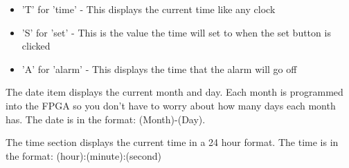 \documentclass[12pt,a4paper,hidelinks]{article}            %
\begin{document}
\begin{itemize}
  \item 'T' for 'time' - This displays the current time like any clock
  \item 'S' for 'set' - This is the value the time will set to when the set button is clicked
  \item 'A' for 'alarm' - This displays the time that the alarm will go off
\end{itemize}

\begin{figure}[H]
\centering
{}
\label{fig:datedisplay}
\end{figure}

The date item displays the current month and day. Each month is programmed into the FPGA so you don't have to worry about how many days each month has. The date is in the format: (Month)-(Day).

\begin{figure}[H]
\centering
{}
\label{fig:timedisplay}
\end{figure}

The time section displays the current time in a 24 hour format. The time is in the format: (hour):(minute):(second)
\end{document}
